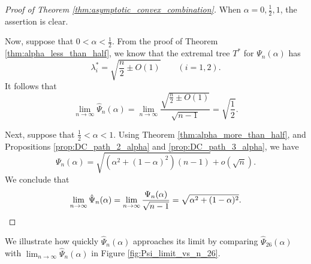 \documentclass[11pt]{article}
\theoremstyle{plain}
\numberwithin{equation}{section}
\begin{document}
\begin{proof}[Proof of Theorem \ref{thm:asymptotic_convex_combination}]
When $\alpha = 0, \frac{1}{2}, 1$, the assertion is clear.

Now, suppose that $0 < \alpha < \frac{1}{2}$. From the proof of Theorem \ref{thm:alpha_less_than_half}, we know that the extremal tree $T^*$ for $\Psi_n(\alpha)$ has \[\lambda_i^* = \sqrt{\frac{n}{2}\pm O(1)} \qquad (i=1,2).\] 
It follows that 
\[\lim_{n \rightarrow \infty}\hat{\Psi}_n(\alpha) = \lim_{n\rightarrow \infty} \frac{\sqrt{\frac{n}{2}\pm O(1)}}{\sqrt{n-1}} = \sqrt{\frac{1}{2}}.\]

Next, suppose that $\frac{1}{2}<\alpha< 1$. Using Theorem \ref{thm:alpha_more_than_half}, and Propositions \ref{prop:DC_path_2_alpha} and \ref{prop:DC_path_3_alpha}, we have \[\Psi_n(\alpha) = \sqrt{(\alpha^2+(1-\alpha)^2)(n-1)} + o(\sqrt{n}).\] 
We conclude that 
\[ \lim_{n\rightarrow \infty} \hat{\Psi}_n(\alpha) = \lim_{n\rightarrow \infty}\frac{\Psi_n(\alpha)}{\sqrt{n-1}} = \sqrt{\alpha^2 + (1-\alpha)^2}.\qedhere\]
\end{proof}

We illustrate how quickly $\hat{\Psi}_n(\alpha)$ approaches its limit by comparing $\hat{\Psi}_{26}(\alpha)$ with $\lim_{n\to \infty}\hat{\Psi}_n(\alpha)$ in Figure \ref{fig:Psi_limit_vs_n_26}.
\end{document}
